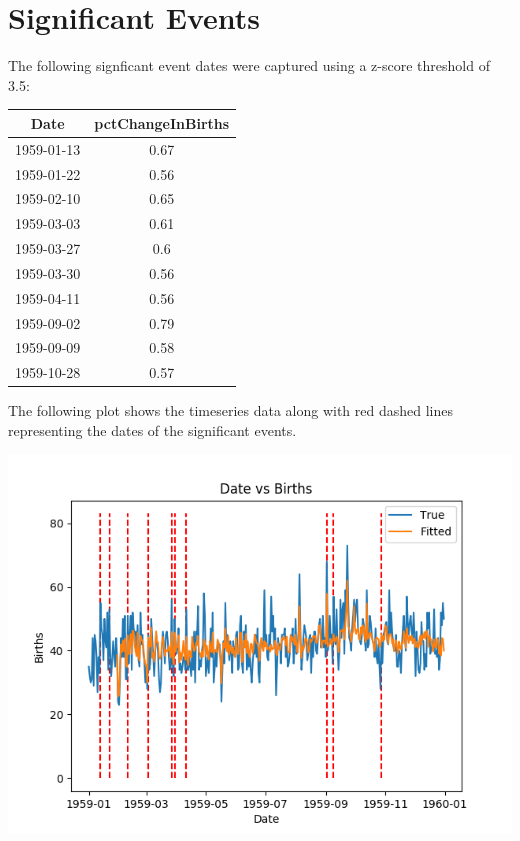 \documentclass {article}
\begin{document}
    \section {Significant Events}

    The following signficant event dates were captured using a z-score threshold of 3.5:
    
    \begin{center}
     \begin{tabular}{||c c||} 
     \hline
     Date & pctChangeInBirths \\ [0.5ex] 
     \hline\hline 1959-01-13 & 0.67 \\ 1959-01-22 & 0.56 \\ 1959-02-10 & 0.65 \\ 1959-03-03 & 0.61 \\ 1959-03-27 & 0.6 \\ 1959-03-30 & 0.56 \\ 1959-04-11 & 0.56 \\ 1959-09-02 & 0.79 \\ 1959-09-09 & 0.58 \\ 1959-10-28 & 0.57 \\  [1ex] 
     \hline
    \end{tabular}
    \end{center}
    
    The following plot shows the timeseries data along with red dashed lines 
    representing the dates of the significant events.

    \begin {center}
    \includegraphics[scale=0.8]{sig_events.png}
    \end {center}

    
\end{document}
